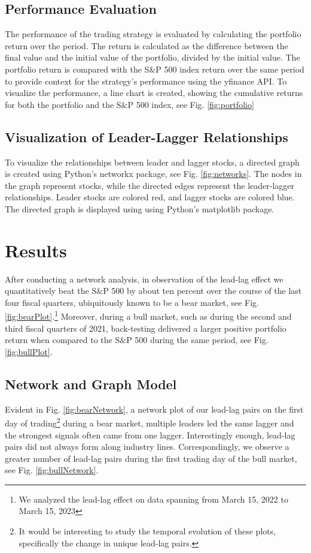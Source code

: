 \documentclass{article}
\begin{document}
\subsection{Performance Evaluation}
The performance of the trading strategy is evaluated by calculating the portfolio return over the period. The return is calculated as the difference between the final value and the initial value of the portfolio, divided by the initial value. The portfolio return is compared with the S$\&$P 500 index return over the same period to provide context for the strategy's performance using the {\selectfont
yfinance} API. To visualize the performance, a line chart is created, showing the cumulative returns for both the portfolio and the S$\&$P 500 index, see Fig. \ref{fig:portfolio}
\subsection{Visualization of Leader-Lagger Relationships}
To visualize the relationships between leader and lagger stocks, a directed graph is created using Python's {\selectfont
networkx} package, see Fig. \ref{fig:networks}. The nodes in the graph represent stocks, while the directed edges represent the leader-lagger relationships. Leader stocks are colored red, and lagger stocks are colored blue. The directed graph is displayed using using Python's {\selectfont
matplotlib} package.
\section{Results}
After conducting a network analysis, in observation of the lead-lag effect we quantitatively beat the S$\&$P 500 by about ten percent over the course of the last four fiscal quarters, ubiquitously known to be a bear market, see Fig. \ref{fig:bearPlot}.\footnote{We analyzed the lead-lag effect on data spanning from March 15, 2022 to March 15, 2023} Moreover, during a bull market, such as during the second and third fiscal quarters of 2021, back-testing delivered a larger positive portfolio return when compared to the S$\&$P 500 during the same period, see Fig. \ref{fig:bullPlot}.
\subsection{Network and Graph Model}
Evident in Fig. \ref{fig:bearNetwork}, a network plot of our lead-lag pairs on the first day of trading\footnote{It would be interesting to study the temporal evolution of these plots, specifically the change in unique lead-lag pairs.} during a bear market, multiple leaders led the same lagger and the strongest signals often came from one lagger. Interestingly enough, lead-lag pairs did not always form along industry lines. Correspondingly, we observe a greater number of lead-lag pairs during the first trading day of the bull market, see Fig. \ref{fig:bullNetwork}.
\end{document}
